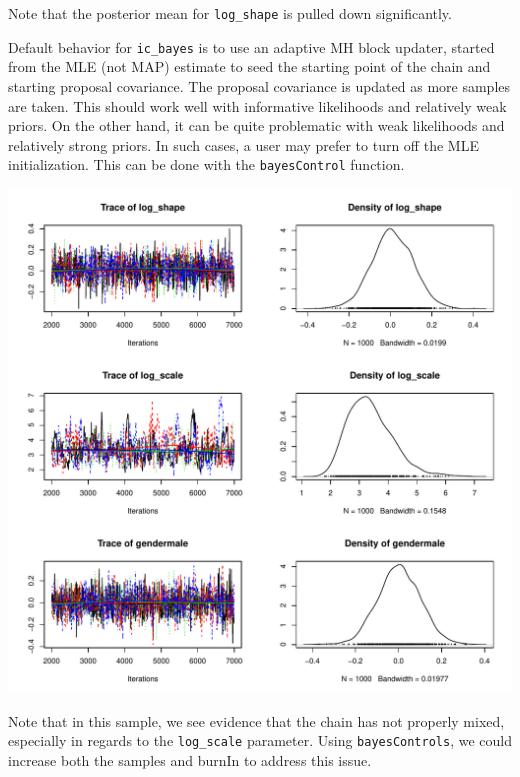 \documentclass[a4paper]{article}
\begin{document}
Note that the posterior mean for \texttt{log\_shape} is pulled down significantly. 

Default behavior for \texttt{ic\_bayes} is to use an adaptive MH block updater, started from the MLE (not MAP) estimate to seed the starting point of the chain and starting proposal covariance. The proposal covariance is updated as more samples are taken. This should work well with informative likelihoods and relatively weak priors. On the other hand, it can be quite problematic with weak likelihoods and relatively strong priors. In such cases, a user may prefer to turn off the MLE initialization. This can be done with the \texttt{bayesControl} function. 

\begin{Schunk}
\end{Schunk}
\includegraphics{icenReg-022}

Note that in this sample, we see evidence that the chain has not properly mixed, especially in regards to the \texttt{log\_scale} parameter. Using \texttt{bayesControls}, we could increase both the samples and burnIn to address this issue. 
\end{document}
